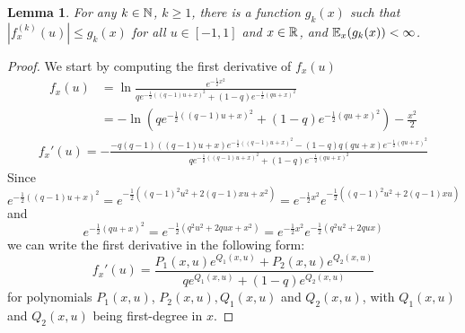 \documentclass{article}
\theoremstyle{plain}
\newtheorem{lemma}[theorem]{Lemma}
\theoremstyle{definition}
\theoremstyle{remark}
\begin{document}
\begin{lemma}\label{lemma:f-derivative-integrable-upper-bound}
    For any $k\in \mathbb{N}$, $k\geq 1$, there is a function $g_k(x)$ such that 
    $|f_x^{(k)}(u)| \leq g_k(x)$ for all $u\in [-1, 1]$ and $x \in \mathbb{R}$, and 
    $\operatorname{\mathbb{E}}_x(g_k(x)) < \infty$.
\end{lemma}
\begin{proof}
    We start by computing the first derivative of $f_x(u)$
    \begin{equation}
        \begin{split}
            f_x(u) &= \ln \frac{e^{-\frac{1}{2}x^2}}{qe^{-\frac{1}{2}((q - 1)u + x)^2} + (1 - q)e^{-\frac{1}{2}(qu + x)^2}}
            \\&= -\ln \left(qe^{-\frac{1}{2}((q - 1)u + x)^2} + (1 - q)e^{-\frac{1}{2}(qu + x)^2}\right) - \frac{x^2}{2}
        \end{split}
    \end{equation}
    \begin{align}
        f_x'(u) = -\frac{-q(q - 1)((q - 1)u + x)e^{-\frac{1}{2}((q - 1)u + x)^2}
        - (1 - q)q(qu + x)e^{-\frac{1}{2}(qu + x)^2}}
        {qe^{-\frac{1}{2}((q - 1)u + x)^2} + (1 - q)e^{-\frac{1}{2}(qu + x)^2}}
    \end{align}
    Since
    \begin{equation}
        e^{-\frac{1}{2}((q - 1)u + x)^2}
        = e^{-\frac{1}{2}((q - 1)^2u^2 + 2(q - 1)xu + x^2)}
        = e^{-\frac{1}{2}x^2}e^{-\frac{1}{2}((q - 1)^2u^2 + 2(q - 1)xu)}
    \end{equation}
    and
    \begin{equation}
        e^{-\frac{1}{2}(qu + x)^2}
        = e^{-\frac{1}{2}(q^2u^2 + 2qux + x^2)}
        = e^{-\frac{1}{2}x^2}e^{-\frac{1}{2}(q^2u^2 + 2qux)}
    \end{equation}
    we can write the first derivative in the following form:
    \begin{equation}
        f_x'(u) = \frac{P_1(x, u) e^{Q_1(x, u)} + P_2(x, u)e^{Q_2(x, u)}}{qe^{Q_1(x, u)} + (1 - q)e^{Q_2(x, u)}}
    \end{equation}
    for polynomials $P_1(x, u)$, $P_2(x, u), Q_1(x, u)$ and $Q_2(x, u)$, with $Q_1(x, u)$ and $Q_2(x, u)$ being 
    first-degree in $x$.


\end{proof}
\end{document}
